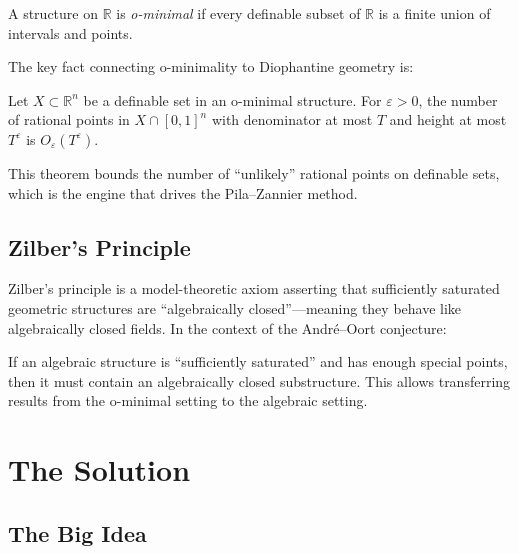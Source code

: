\begin{definition}
A structure on $\mathbb{R}$ is \emph{o-minimal} if every definable subset of $\mathbb{R}$ is a finite union of intervals and points.
\end{definition}

The key fact connecting o-minimality to Diophantine geometry is:

\begin{theorem}
Let $X \subset \mathbb{R}^n$ be a definable set in an o-minimal structure. For $\varepsilon > 0$, the number of rational points in $X \cap [0,1]^n$ with denominator at most $T$ and height at most $T^\varepsilon$ is $O_\varepsilon(T^\varepsilon)$.
\end{theorem}

This theorem bounds the number of ``unlikely'' rational points on definable sets, which is the engine that drives the Pila--Zannier method.

\subsection{Zilber's Principle}

Zilber's principle is a model-theoretic axiom asserting that sufficiently saturated geometric structures are ``algebraically closed''---meaning they behave like algebraically closed fields. In the context of the André--Oort conjecture:

\begin{fact}
If an algebraic structure is ``sufficiently saturated'' and has enough special points, then it must contain an algebraically closed substructure. This allows transferring results from the o-minimal setting to the algebraic setting.
\end{fact}

\section{The Solution}

\subsection{The Big Idea}

